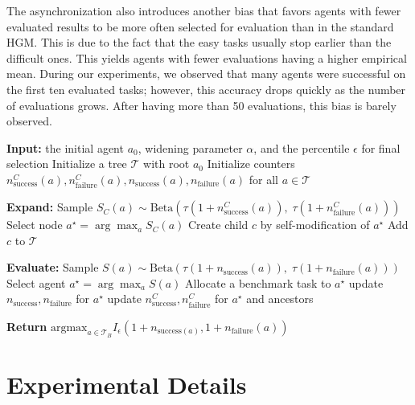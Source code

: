 \documentclass{article} %
\begin{document}
The asynchronization also introduces another bias that favors agents with fewer evaluated results to be more often selected for evaluation than in the standard HGM. This is due to the fact that the easy tasks usually stop earlier than the difficult ones. This yields agents with fewer evaluations having a higher empirical mean. During our experiments, we observed that many agents were successful on the first ten evaluated tasks; however, this accuracy drops quickly as the number of evaluations grows. After having more than 50 evaluations, this bias is barely observed.

\begin{algorithm}[h]
\caption{Huxley--G\"odel Machine (HGM)} 
\label{alg:hgm}
\begin{algorithmic}[1]
\STATE \textbf{Input:} the initial agent $a_0$, widening parameter $\alpha$, and the percentile $\epsilon$ for final selection
\STATE Initialize a tree $\mathcal{T}$ with root $a_0$
\STATE Initialize counters $n^C_{\text{success}}(a), n^C_{\text{failure}}(a), n_{\text{success}}(a), n_{\text{failure}}(a)$ for all $a \in \mathcal{T}$

        \STATE \textbf{Expand:}
            \STATE Sample $S_C(a)\sim \text{Beta}(\tau(1+n^C_{\text{success}}(a)),\; \tau(1+n^C_{\text{failure}}(a)))$
        \ENDFOR
        \STATE Select node $a^\star = \arg\max_a S_C(a)$
        \STATE Create child $c$ by self-modification of $a^\star$
        \STATE Add $c$ to $\mathcal{T}$
        
    \ELSE
        \STATE \textbf{Evaluate:}
            \STATE Sample $S(a) \sim \text{Beta}(\tau(1+n_\text{success}(a)),\; \tau(1+n_\text{failure}(a)))$
        \ENDFOR
        \STATE Select agent $a^\star = \arg\max_a S(a)$
        \STATE Allocate a benchmark task to $a^\star$
        \STATE update $n_{\text{success}}, n_{\text{failure}}$ for $a^\star$
        \STATE update $n^C_{\text{success}}, n^C_{\text{failure}}$ for $a^\star$ and ancestors
        
    \ENDIF
\ENDWHILE
\STATE \textbf{Return} $\text{argmax}_{a\in \mathcal{T}_B} I_\epsilon(1 + n_{\text{success}(a)}, 1 + n_{\text{failure}}(a))$
\end{algorithmic}
\end{algorithm}

\newpage
\section{Experimental Details}
\end{document}
